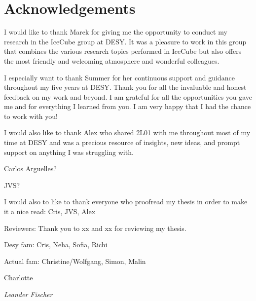 \chapter*{Acknowledgements}
I would like to thank Marek for giving me the opportunity to conduct my research in the IceCube group at DESY. It was a pleasure to work in this group that combines the various research topics performed in IceCube but also offers the most friendly and welcoming atmosphere and wonderful colleagues.

I especially want to thank Summer for her continuous support and guidance throughout my five years at DESY. Thank you for all the invaluable and honest feedback on my work and beyond. I am grateful for all the opportunities you gave me and for everything I learned from you. I am very happy that I had the chance to work with you!

I would also like to thank Alex who shared 2L01 with me throughout most of my time at DESY and was a precious resource of insights, new ideas, and prompt support on anything I was struggling with.

Carlos Arguelles?

JVS?

I would also to like to thank everyone who proofread my thesis in order to make it a nice read:
Cris, JVS, Alex  


Reviewers:
Thank you to xx and xx for reviewing my thesis.


Desy fam:
Cris, Neha, Sofia, Richi


Actual fam:
Christine/Wolfgang, Simon, Malin

Charlotte


\begin{flushright}
	\textit{Leander Fischer}
\end{flushright}